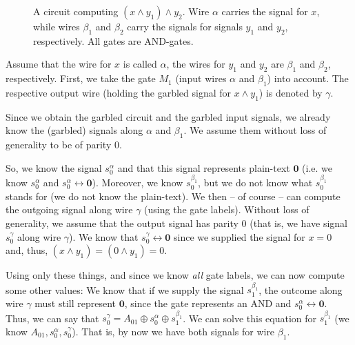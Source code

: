 \begin{figure}[t]
  \centering
  \caption{A circuit computing $(x\wedge y_1)\wedge y_2$. Wire $\alpha$ carries the signal for $x$, while wires $\beta_1$ and $\beta_2$ carry the signals for signals $y_1$ and $y_2$, respectively. All gates are AND-gates.}
  \label{fig:circuit-used-for-pseudorandom-generator}
\end{figure}

Assume that the wire for $x$ is called $\alpha$, the wires for $y_1$ and $y_2$ are $\beta_1$ and $\beta_2$, respectively. First, we take the gate $M_1$ (input wires $\alpha$ and $\beta_1$) into account. The respective output wire (holding the garbled signal for $x\wedge y_1$) is denoted by $\gamma$.

Since we obtain the garbled circuit and the garbled input signals, we already know the (garbled) signals along $\alpha$ and $\beta_1$. We assume them without loss of generality to be of parity $0$.

So, we know the signal $s^\alpha_0$ and that this signal represents plain-text $\mathbf{0}$ (i.e. we know $s^\alpha_0$ and $s^\alpha_0 \leftrightarrow \mathbf{0}$). Moreover, we know $s_0^{\beta_1}$, but we do not know what $s_0^{\beta_1}$ stands for (we do not know the plain-text). We then -- of course -- can compute the outgoing signal along wire $\gamma$ (using the gate labels). Without loss of generality, we assume that the output signal has parity $0$ (that is, we have signal $s_0^\gamma$ along wire $\gamma$). We know that $s_0^\gamma \leftrightarrow \mathbf{0}$ since we supplied the signal for $x=0$ and, thus, $(x\wedge y_1)=(0\wedge y_1) = 0$.

Using only these things, and since we know \emph{all} gate labels, we can now compute some other values: We know that if we supply the signal $s_1^{\beta_1}$, the outcome along wire $\gamma$ must still represent $\mathbf{0}$, since the gate represents an AND and $s_0^\alpha\leftrightarrow \mathbf{0}$. Thus, we can say that $s_0^\gamma=A_{01}\oplus s_0^\alpha \oplus s_1^{\beta_1}$. We can solve this equation for $s_1^{\beta_1}$ (we know $A_{01}, s_0^\alpha, s_0^\gamma$). That is, by now we have both signals for wire $\beta_1$.

